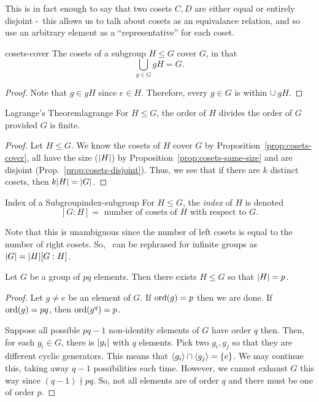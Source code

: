\documentclass{article}
\begin{document}
This is in fact enough to say that two cosets $C, D$ are either
equal or entirely disjoint -\ this allows us to talk about cosets as an equivalance relation, and so use an arbitrary element as a ``representative'' for each coset.

\begin{proposition}{}{cosets-cover}
  The cosets of a subgroup $H \le G$ cover $G$, in that
  \[ \bigcup_{g \in G} gH = G. \]
\end{proposition}
\begin{proof}
  Note that $g \in gH$ since $e \in H$. Therefore, every $g \in G$ is within $\cup\ gH$.
\end{proof}


\begin{theorem}{Lagrange's Theorem}{lagrange}
  For $H \le G$, the order of $H$ divides the order of $G$ provided $G$ is finite.
\end{theorem}
\begin{proof}
  Let $H \le G$.
  We know the cosets of $H$ cover $G$ by Proposition~\ref{prop:cosets-cover},
  all have the size ($\lvert H\rvert$) by Proposition~\ref{prop:cosets-same-size}
  and are disjoint (Prop.~\ref{prop:cosets-disjoint}).
  Thus, we see that if there are $k$ distinct cosets, then $k\lvert H\rvert = \lvert G\rvert$.
\end{proof}

\begin{definition}{Index of a Subgroup}{index-subgroup}
  For $H \le G$, the \emph{index} of $H$ is denoted
  \[ [G : H] = \text{ number of cosets of } H \text{ with respect to } G. \]
\end{definition}
Note that this is unambiguous since the number of left cosets is equal
to the number of right cosets.
So,~ can be rephrased for infinite groups as $\lvert G\rvert = \lvert H\rvert[G : H]$.

\begin{proposition}{}{}
  Let $G$ be a group of $pq$ elements.
  Then there exists $H \le G$ so that $\lvert H\rvert = p$.
\end{proposition}
\begin{proof}
  Let $g \ne e$ be an element of $G$.
  If $\operatorname{ord}(g) = p$ then we are done.
  If $\operatorname{ord}(g) = pq$, then $\operatorname{ord}(g^{q}) = p$.

  Suppose all possible $pq - 1$ non-identity elements of $G$ have order $q$ then.
  Then, for each $g_{i} \in G$, there is $\lvert g_{i}\rvert$ with $q$ elements.
  Pick two $g_{i},g_{j}$ so that they are different cyclic generators.
  This means that $\langle g_{i}\rangle \cap \langle g_{j}\rangle = \lbrace e\rbrace$.
  We may continue this, taking away $q - 1$ possibilities each time.
  However, we cannot exhaust $G$ this way since $(q - 1) \nmid pq$.
  So, not all elements are of order $q$ and there must be one of order $p$.
\end{proof}
\end{document}
